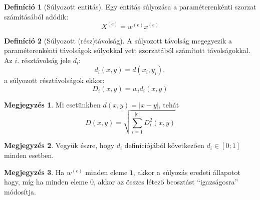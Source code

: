 \documentclass[twocolumn]{article}
\theoremstyle{definition}
\newtheorem{definition}{Definíció}[section]
\newtheorem*{megj}{Megjegyzés}
\newcommand{\ent}[2]{ {#1}^{(#2)} }
\begin{document}
    \begin{definition}[Súlyozott entitás]
        Egy entitás súlyozása a paraméterenkénti szorzat számításából adódik:
        \begin{equation}
            \ent X e = \ent w e \ent x e
        \end{equation}
    \end{definition}
    
    \begin{definition}[Súlyozott (rész)távolság]
        A súlyozott távolság megegyezik a paraméterenkénti távolságok súlyokkal vett szorzatából számított távolságokkal. Az $i.$ résztávolság jele $d_i$:
        \begin{equation}
            d_i(x, y) = d(x_i, y_i),
        \end{equation}
        a súlyozott résztávolságok ekkor:
        \begin{equation}
            D_{i}(x, y) = w_id_i(x, y)
        \end{equation}
        \begin{megj}
            Mi esetünkben $d(x, y) = |x-y|$, tehát
            \begin{equation}\label{eq:sulyozott_euklideszi}
                D(x, y) = \sqrt{\sum_{i=1}^{|e|} D_i^2(x, y)} 
            \end{equation}
        \end{megj}
        \begin{megj}
        \label{megj:d_i_in01}
            Vegyük észre, hogy $d_i$ definíciójából következően $d_i \in [0; 1]$ minden esetben.
        \end{megj}
    \end{definition}
    
    \begin{megj}
        Ha $\ent w e$ minden eleme $1$, akkor a súlyozás eredeti állapotot hagy, míg ha minden eleme $0$, akkor az összes létező beosztást \enquote{igazságosra} módosítja.
    \end{megj}
    
\end{document}

